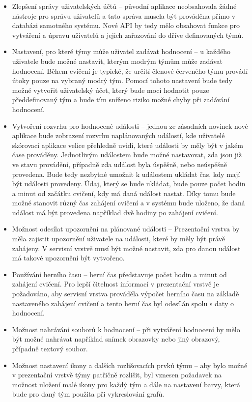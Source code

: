 \documentclass[
  digital, %
  twoside, %
  table,   %
  lof,     %
  lot,     %
]{fithesis3}
\begin{document}
\begin{itemize}
\item Zlepšení správy uživatelských účtů -- původní aplikace neobsahovala žádné nástroje pro správu uživatelů a tato správa musela být prováděna přímo v databázi samotného systému. Nové API by tedy mělo obsahovat funkce pro vytváření a úpravu uživatelů a jejich zařazování do dříve definovaných týmů.
\item Nastavení, pro které týmy může uživatel zadávat hodnocení -- u každého uživatele bude možné nastavit, kterým modrým týmům může zadávat hodnocení. Během cvičení je typické, že určití členové červeného týmu provádí útoky pouze na vybraný modrý tým. Pomocí tohoto nastavení bude tedy možné vytvořit uživatelský účet, který bude moci hodnotit pouze předdefinovaný tým a bude tím sníženo riziko možné chyby při zadávání hodnocení.
\item Vytvoření rozvrhu pro hodnocené události -- jednou ze zásadních novinek nové aplikace bude zobrazení rozvrhu naplánovaných událostí, kde uživatelé skórovací aplikace velice přehledně uvidí, které události by měly být v jakém čase prováděny. Jednotlivým událostem bude možné nastavovat, zda jsou již ve stavu provádění, případně zda událost byla úspěšně, nebo neúspěšně provedena. Bude tedy nezbytné umožnit k událostem ukládat čas, kdy mají být události provedeny. Údaj, který se bude ukládat, bude pouze počet hodin a minut od začátku cvičení, kdy má daná událost nastat. Díky tomu bude možné stanovit různý čas zahájení cvičení a v systému bude uloženo, že daná událost má být provedena například dvě hodiny po zahájení cvičení.
\item Možnost odesílat upozornění na plánované události -- Prezentační vrstva by měla zajistit upozornění uživatele na události, které by měly být právě zahájeny. V servisní vrstvě musí být možné nastavit, zda pro danou událost má takové upozornění být vytvořeno.
\item Používání herního času -- herní čas představuje počet hodin a minut od zahájení cvičení. Pro lepší čitelnost informací v prezentační vrstvě je požadováno, aby servisní vrstva prováděla výpočet herního času na základě nastaveného zahájení cvičení a tento herní čas byl odesílán spolu s daty o hodnocení.
\item Možnost nahrávání souborů k hodnocení – při vytváření hodnocení by mělo být možné nahrávat například snímek obrazovky nebo jiný obrazový, případně textový soubor.
\item Možnost nastavení ikony a dalších rozlišovacích prvků týmu -- aby bylo možné v prezentační vrstvě týmy patřičně rozlišit, byl vznesen požadavek na možnost uložení malé ikony pro každý tým a dále na nastavení barvy, která bude pro daný tým použita při vykreslování grafů.
\end{itemize}
\end{document}
